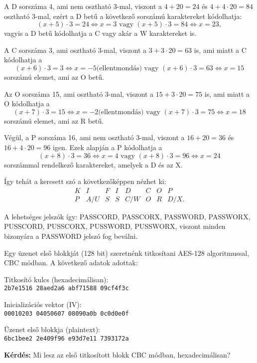 \begin{solution}
A D sorszáma 4, ami nem osztható 3-mal, viszont a $4+20=24$ és $4+4\cdot20=84$
osztható 3-mal, ezért a D betű a következő sorszámú karaktereket kódolhatja:
\[
(x+5)\cdot3=24\Leftrightarrow x=3\text{ vagy }(x+5)\cdot3=84\Leftrightarrow x=23,
\]
vagyis a D betű kódolhatja a C vagy akár a W karaktereket is.

A C sorszáma 3, ami osztható 3-mal, viszont a $3+3\cdot20=63$ is,
ami miatt a C kódolhatja a 
\[
(x+6)\cdot3=3\Leftrightarrow x=-5\text{(ellentmondás)}\text{ vagy }(x+6)\cdot3=63\Leftrightarrow x=15
\]
sorszámú elemet, ami az O betű.

Az O sorszáma 15, ami osztható 3-mal, viszont a $15+3\cdot20=75$
is, ami miatt a O kódolhatja a 
\[
(x+7)\cdot3=15\Leftrightarrow x=-2\text{(ellentmondás)}\text{ vagy }(x+7)\cdot3=75\Leftrightarrow x=18
\]
sorszámú elemet, ami az R betű.

Végül, a P sorszáma 16, ami nem osztható 3-mal, viszont a $16+20=36$
és $16+4\cdot20=96$ igen. Ezek alapján a P kódolhatja a 
\[
(x+8)\cdot3=36\Leftrightarrow x=4\text{ vagy }(x+8)\cdot3=96\Leftrightarrow x=24
\]
sorszámmal rendelkező karaktereket, amelyek a D és az X.

Így tehát a keresett szó a következőképpen nézhet ki: 
\[
\begin{array}{c|c|c|c|c|c|c|c}
K & I & F & I & D & C & O & P\\
\hline P & A/U & S & S & C/W & O & R & D/X.
\end{array}
\]

A lehetséges jelszók így: PASSCORD, PASSCORX, PASSWORD, PASSWORX,
PUSSCORD, PUSSCORX, PUSSWORD, PUSSWORX, viszont minden bizonyára a
PASSWORD jelszó fog beválni. 
\end{solution}
\begin{extraproblem}
Egy üzenet első blokkját (128 bit) szeretnénk titkosítani AES-128
algoritmussal, CBC módban. A következő adatok adottak:

Titkosító kulcs (hexadecimálisan): \\
 \texttt{2b7e1516 28aed2a6 abf71588 09cf4f3c}

Inicializációs vektor (IV): \\
 \texttt{00010203 04050607 08090a0b 0c0d0e0f}

Üzenet első blokkja (plaintext): \\
 \texttt{6bc1bee2 2e409f96 e93d7e11 7393172a}

\textbf{Kérdés:} Mi lesz az első titkosított blokk CBC módban, hexadecimálisan?
\end{extraproblem}

